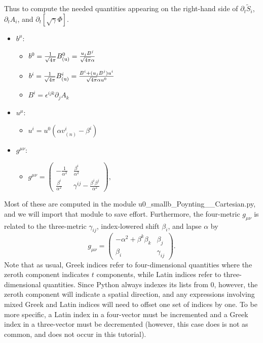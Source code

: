 \documentclass[landscape,letterpaper,10pt,english]{article}
\providecommand{\tightlist}{%
      \setlength{\itemsep}{0pt}\setlength{\parskip}{0pt}}
\begin{document}
Thus to compute the needed quantities appearing on the right-hand side
of \(\partial_t \tilde{S}_i\), \(\partial_t A_i\), and
\(\partial_t \left[\sqrt{\gamma}\Phi\right]\).

\begin{itemize}
\tightlist
\item
  \(b^\mu\):

  \begin{itemize}
  \tightlist
  \item
    \(b^0 = \frac{1}{\sqrt{4\pi}} B^0_{\rm (u)} = \frac{u_j B^j}{\sqrt{4\pi}\alpha}\)
  \item
    \(b^i = \frac{1}{\sqrt{4\pi}} B^i_{\rm (u)} = \frac{B^i + (u_j B^j) u^i}{\sqrt{4\pi}\alpha u^0}\)
  \item
    \(B^i = \epsilon^{ijk} \partial_j A_k\)
  \end{itemize}
\item
  \(u^\mu\):

  \begin{itemize}
  \tightlist
  \item
    \(u^i = u^0 (\alpha v^i_{(n)} - \beta^i)\)
  \end{itemize}
\item
  \(g^{\mu \nu}\):

  \begin{itemize}
  \tightlist
  \item
    \(g^{\mu\nu} = \begin{pmatrix} -\frac{1}{\alpha^2} & \frac{\beta^i}{\alpha^2} \\ \frac{\beta^i}{\alpha^2} & \gamma^{ij} - \frac{\beta^i\beta^j}{\alpha^2} \end{pmatrix},\)
  \end{itemize}
\end{itemize}

Most of these are computed in the module
u0\_smallb\_Poynting\_\_Cartesian.py, and we will import that module to
save effort. Furthermore, the four-metric \(g_{\mu\nu}\) is related to
the three-metric \(\gamma_{ij}\), index-lowered shift \(\beta_i\), and
lapse \(\alpha\) by \[
g_{\mu\nu} = \begin{pmatrix} 
-\alpha^2 + \beta^k \beta_k & \beta_j \\
\beta_i & \gamma_{ij}
\end{pmatrix}.
\] Note that as usual, Greek indices refer to four-dimensional
quantities where the zeroth component indicates \(t\) components, while
Latin indices refer to three-dimensional quantities. Since Python always
indexes its lists from 0, however, the zeroth component will indicate a
spatial direction, and any expressions involving mixed Greek and Latin
indices will need to offset one set of indices by one. To be more
specific, a Latin index in a four-vector must be incremented and a Greek
index in a three-vector must be decremented (however, this case does is
not as common, and does not occur in this tutorial).
\end{document}
